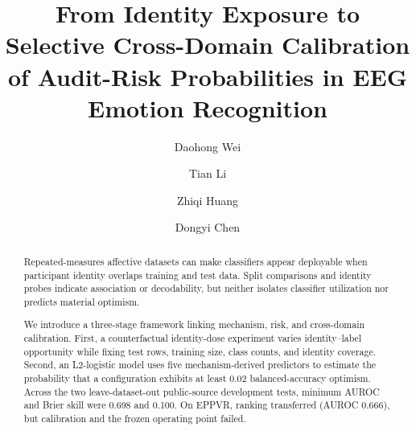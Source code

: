 \documentclass[preprint,12pt]{elsarticle}
\begin{document}
\begin{frontmatter}

\title{From Identity Exposure to Selective Cross-Domain Calibration of Audit-Risk Probabilities in EEG Emotion Recognition}

\author[aff1]{Daohong Wei}
\author[aff2]{Tian Li}
\author[aff1]{Zhiqi Huang}
\author[aff3,aff1]{Dongyi Chen}


\begin{abstract}
Repeated-measures affective datasets can make classifiers appear deployable when participant identity overlaps training and test data. Split comparisons and identity probes indicate association or decodability, but neither isolates classifier utilization nor predicts material optimism.

We introduce a three-stage framework linking mechanism, risk, and cross-domain calibration. First, a counterfactual identity-dose experiment varies identity--label opportunity while fixing test rows, training size, class counts, and identity coverage. Second, an L2-logistic model uses five mechanism-derived predictors to estimate the probability that a configuration exhibits at least 0.02 balanced-accuracy optimism. Across the two leave-dataset-out public-source development tests, minimum AUROC and Brier skill were 0.698 and 0.100. On EPPVR, ranking transferred (AUROC 0.666), but calibration and the frozen operating point failed.


\end{abstract}
\end{frontmatter}
\end{document}
